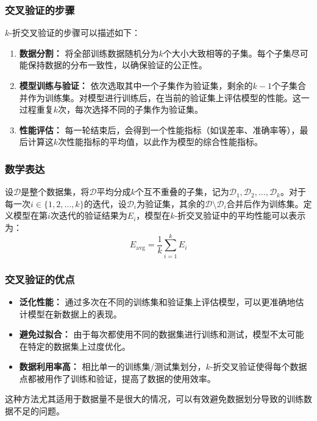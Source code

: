 \documentclass[a4paper,12pt]{article}
\begin{document}
\subsubsection{交叉验证的步骤}
$k$-折交叉验证的步骤可以描述如下：

\begin{enumerate}
	\item \textbf{数据分割：} 将全部训练数据随机分为$k$个大小大致相等的子集。每个子集尽可能保持数据的分布一致性，以确保验证的公正性。
	
	\item \textbf{模型训练与验证：} 依次选取其中一个子集作为验证集，剩余的$k-1$个子集合并作为训练集。对模型进行训练后，在当前的验证集上评估模型的性能。这一过程重复$k$次，每次选择不同的子集作为验证集。
	
	\item \textbf{性能评估：} 每一轮结束后，会得到一个性能指标（如误差率、准确率等），最后计算这$k$次性能指标的平均值，以此作为模型的综合性能指标。
\end{enumerate}

\subsubsection{数学表达}
设$\mathcal{D}$是整个数据集，将$\mathcal{D}$平均分成$k$个互不重叠的子集，记为$\mathcal{D}_1, \mathcal{D}_2, \ldots, \mathcal{D}_k$。对于每一次$i \in \{1, 2, \ldots, k\}$的迭代，设$\mathcal{D}_i$为验证集，其余的$\mathcal{D} \setminus \mathcal{D}_i$合并后作为训练集。定义模型在第$i$次迭代的验证结果为$E_i$，模型在$k$-折交叉验证中的平均性能可以表示为：
\[
E_{\text{avg}} = \frac{1}{k} \sum_{i=1}^k E_i
\]

\subsubsection{交叉验证的优点}
\begin{itemize}
	\item \textbf{泛化性能：} 通过多次在不同的训练集和验证集上评估模型，可以更准确地估计模型在新数据上的表现。
	\item \textbf{避免过拟合：} 由于每次都使用不同的数据集进行训练和测试，模型不太可能在特定的数据集上过度优化。
	\item \textbf{数据利用率高：} 相比单一的训练集/测试集划分，$k$-折交叉验证使得每个数据点都被用作了训练和验证，提高了数据的使用效率。
\end{itemize}

这种方法尤其适用于数据量不是很大的情况，可以有效避免数据划分导致的训练数据不足的问题。
\end{document}

